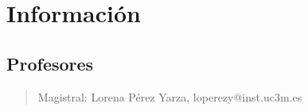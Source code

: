 \documentclass[12pt, twoside, openright]{report} %
\begin{document}
\tableofcontents
\thispagestyle{fancy}

\listoffigures
\thispagestyle{fancy}

\listoftables
\thispagestyle{fancy}




\chapter{Información}\label{ch:informacion}
\section{Profesores}\label{sec:profesores}
\begin{quote}
	Magistral: Lorena Pérez Yarza, loperezy@inst.uc3m.es
\end{quote}














\end{document}

